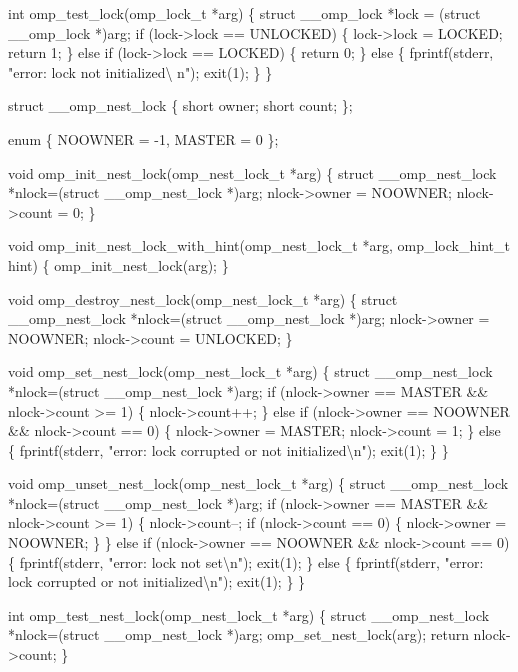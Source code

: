 {\begin{codepar}
int omp\_test\_lock(omp\_lock\_t *arg)
\{
struct \_\_omp\_lock *lock = (struct \_\_omp\_lock *)arg;
    if (lock->lock == UNLOCKED)
    \{
        lock->lock = LOCKED;
        return 1;
    \}
    else if (lock->lock == LOCKED)
    \{
        return 0;
    \}
    else
    \{
        fprintf(stderr, "error: lock not initialized{\textbackslash} n");
        exit(1);
    \}
\}

struct \_\_omp\_nest\_lock
\{
    short owner;
    short count;
\};

enum \{ NOOWNER = -1, MASTER = 0 \};

void omp\_init\_nest\_lock(omp\_nest\_lock\_t *arg)
\{
    struct \_\_omp\_nest\_lock *nlock=(struct \_\_omp\_nest\_lock *)arg;
    nlock->owner = NOOWNER;
    nlock->count = 0;
\}

void omp\_init\_nest\_lock\_with\_hint(omp\_nest\_lock\_t *arg, 
                                  omp\_lock\_hint\_t hint)
\{
    omp\_init\_nest\_lock(arg);
\}

void omp\_destroy\_nest\_lock(omp\_nest\_lock\_t *arg)
\{
    struct \_\_omp\_nest\_lock *nlock=(struct \_\_omp\_nest\_lock *)arg;
    nlock->owner = NOOWNER;
    nlock->count = UNLOCKED;
\}

void omp\_set\_nest\_lock(omp\_nest\_lock\_t *arg)
\{
    struct \_\_omp\_nest\_lock *nlock=(struct \_\_omp\_nest\_lock *)arg;
    if (nlock->owner == MASTER \&\& nlock->count >= 1)
    \{
        nlock->count++;
    \}
    else if (nlock->owner == NOOWNER \&\& nlock->count == 0)
    \{
        nlock->owner = MASTER;
        nlock->count = 1;
    \}
    else
    \{
        fprintf(stderr, "error: lock corrupted or not initialized{\textbackslash}n");
        exit(1);
    \}
\}

void omp\_unset\_nest\_lock(omp\_nest\_lock\_t *arg)
\{
    struct \_\_omp\_nest\_lock *nlock=(struct \_\_omp\_nest\_lock *)arg;
    if (nlock->owner == MASTER \&\& nlock->count >= 1)
    \{
        nlock->count--;
        if (nlock->count == 0)
        \{
            nlock->owner = NOOWNER;
        \}
    \}
    else if (nlock->owner == NOOWNER \&\& nlock->count == 0)
    \{
        fprintf(stderr, "error: lock not set{\textbackslash}n");
        exit(1);
    \}
    else
    \{
        fprintf(stderr, "error: lock corrupted or not initialized{\textbackslash}n");
        exit(1);
    \}
\}

int omp\_test\_nest\_lock(omp\_nest\_lock\_t *arg)
\{
    struct \_\_omp\_nest\_lock *nlock=(struct \_\_omp\_nest\_lock *)arg;
    omp\_set\_nest\_lock(arg);
    return nlock->count;
\}


\end{codepar}}
